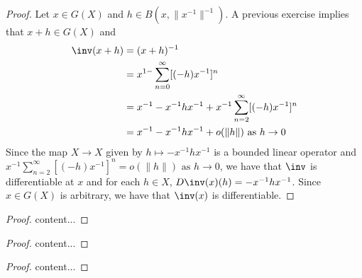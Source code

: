 \documentclass{book}
\begin{document}
\begin{proof}
	Let $x \in G(X)$ and $h \in B(x, \|x^{-1}\|^{-1})$. A previous exercise implies that $x + h \in G(X)$ and 
	\begin{align*}
		\inv(x+h) 
		& = (x+h)^{-1} \\
		& = x^{1-} \sum_{n=0}^{\infty} [(-h) x^{-1}]^n \\
		& = x^{-1} - x^{-1}hx^{-1} + x^{-1}\sum_{n=2}^{\infty} [(-h) x^{-1}]^n \\
		& = x^{-1} - x^{-1}hx^{-1} + o(\|h\|) \text{ as $h \rightarrow 0$}
	\end{align*}
	Since the map $X \rightarrow X$ given by $h \mapsto - x^{-1}hx^{-1}$ is a bounded linear operator and  $x^{-1}\sum\limits_{n=2}^{\infty} [(-h) x^{-1}]^n = o(\|h\|) \text{ as $h \rightarrow 0$}$, we have that $\inv$ is differentiable at $x$ and for each $h \in X$, $D\inv(x)(h) = - x^{-1}hx^{-1}$. Since $x \in G(X)$ is arbitrary, we have that $\inv(x)$ is differentiable. 
\end{proof}


\begin{ex}
	
\end{ex}

\begin{proof}
	content...
\end{proof}

\begin{ex}
	
\end{ex}

\begin{proof}
	content...
\end{proof}


\begin{ex}
	
\end{ex}

\begin{proof}
	content...
\end{proof}
\end{document}
